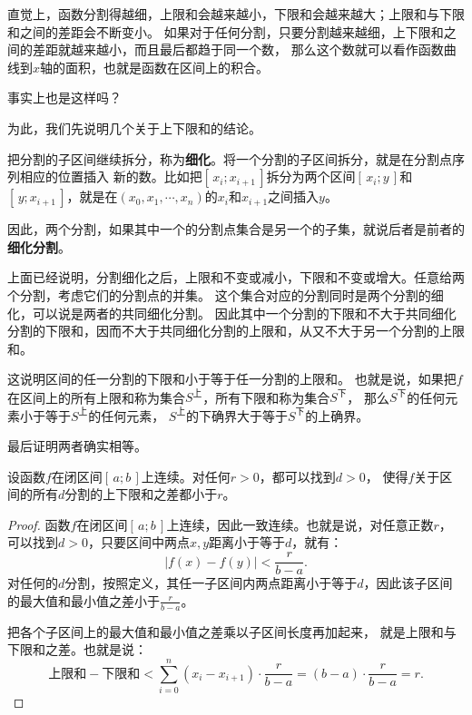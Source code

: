 \documentclass[12pt,UTF8,fontset=none]{ctexbook}
\begin{document}
\begin{appendix}
直觉上，函数分割得越细，上限和会越来越小，下限和会越来越大；上限和与下限和之间的差距会不断变小。
如果对于任何分割，只要分割越来越细，上下限和之间的差距就越来越小，而且最后都趋于同一个数，
那么这个数就可以看作函数曲线到$x$轴的面积，也就是函数在区间上的积合。

事实上也是这样吗？

为此，我们先说明几个关于上下限和的结论。

把分割的子区间继续拆分，称为\textbf{细化}。将一个分割的子区间拆分，就是在分割点序列相应的位置插入
新的数。比如把$[\,x_i; x_{i+1}\,]$拆分为两个区间$[\,x_i; y\,]$和$[\,y; x_{i+1}\,]$，就是在$(x_0, x_1, \cdots, x_n)$的$x_i$和$x_{i+1}$之间插入$y$。

因此，两个分割，如果其中一个的分割点集合是另一个的子集，就说后者是前者的\textbf{细化分割}。

上面已经说明，分割细化之后，上限和不变或减小，下限和不变或增大。任意给两个分割，考虑它们的分割点的并集。
这个集合对应的分割同时是两个分割的细化，可以说是两者的共同细化分割。
因此其中一个分割的下限和不大于共同细化分割的下限和，因而不大于共同细化分割的上限和，从又不大于另一个分割的上限和。

这说明区间的任一分割的下限和小于等于任一分割的上限和。
也就是说，如果把$f$在区间上的所有上限和称为集合$S^{\text{上}}$，所有下限和称为集合$S^{\text{下}}$，
那么$S^{\text{下}}$的任何元素小于等于$S^{\text{上}}$的任何元素，
$S^{\text{上}}$的下确界大于等于$S^{\text{下}}$的上确界。

最后证明两者确实相等。

\begin{tm}\label{tm:c-1-10}
    设函数$f$在闭区间$[\,a; b\,]$上连续。对任何$r>0$，都可以找到$d>0$，
    使得$f$关于区间的所有$d$\dash 分割的上下限和之差都小于$r$。
\end{tm}

\begin{proof}
    函数$f$在闭区间$[\,a; b\,]$上连续，因此一致连续。也就是说，对任意正数$r$，
    可以找到$d>0$，只要区间中两点$x,y$距离小于等于$d$，就有：
    $$ |f(x) - f(y)| < \frac{r}{b - a}. $$
    对任何的$d$\dash 分割，按照定义，其任一子区间内两点距离小于等于$d$，因此该子区间的最大值和最小值之差小于$\frac{r}{b - a}$。
    
    把各个子区间上的最大值和最小值之差乘以子区间长度再加起来，
    就是上限和与下限和之差。也就是说：
    $$ \mbox{上限和} - \mbox{下限和} < \sum_{i=0}^n (x_i - x_{i+1}) \cdot \frac{r}{b - a} = (b - a) \cdot \frac{r}{b - a} = r.$$
\end{proof}


\end{appendix}
\end{document}
